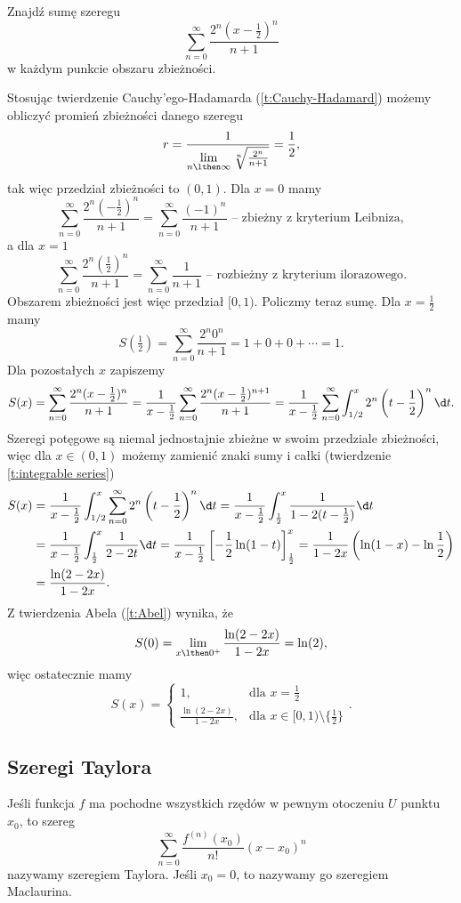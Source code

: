 \begin{example}
    Znajdź sumę szeregu
    \[ \sum_{n=0}^\infty \frac{2^n(x - \frac{1}{2})^n}{n+1} \]
    w każdym punkcie obszaru zbieżności.
\end{example}
\begin{solution}
    Stosując twierdzenie Cauchy'ego-Hadamarda (\ref{t:Cauchy-Hadamard}) możemy obliczyć promień zbieżności danego szeregu
    \[ r = \frac{1}{\lim\limits_{n\lthen\infty}\sqrt[n]{\frac{2^n}{n+1}}} = \frac{1}{2}, \]
    tak więc przedział zbieżności to $(0, 1)$.
    Dla $x = 0$ mamy
    \[ \sum_{n=0}^\infty \frac{2^n\left(-\frac{1}{2}\right)^n}{n+1} = \sum_{n=0}^\infty \frac{(-1)^n}{n+1} \text{ -- zbieżny z kryterium Leibniza}, \]
    a dla $x = 1$
    \[ \sum_{n=0}^\infty \frac{2^n\left(\frac{1}{2}\right)^n}{n+1} = \sum_{n=0}^\infty \frac{1}{n+1} \text{ -- rozbieżny z kryterium ilorazowego}. \]
    Obszarem zbieżności jest więc przedział $[0, 1)$. Policzmy teraz sumę. Dla $x = \frac{1}{2}$ mamy
    \[ S(\tfrac{1}{2}) = \sum_{n=0}^\infty \frac{2^n0^n}{n+1} = 1 + 0 + 0 + \cdots = 1. \]
    Dla pozostałych $x$ zapiszemy
    \[ S(x) = \sum_{n=0}^\infty \frac{2^n(x - \frac{1}{2})^n}{n+1} = \frac{1}{x - \frac{1}{2}}\sum_{n=0}^\infty \frac{2^n(x - \frac{1}{2})^{n+1}}{n+1} = \frac{1}{x - \frac{1}{2}}\sum_{n=0}^\infty \int_{1/2}^x 2^n\left(t-\frac{1}{2}\right)^n\d t. \]
    Szeregi potęgowe są niemal jednostajnie zbieżne w swoim przedziale zbieżności, więc dla $x \in (0, 1)$ możemy zamienić znaki sumy i całki (twierdzenie \ref{t:integrable series})
    \begin{align*}
        S(x) &= \frac{1}{x - \frac{1}{2}}\int_{1/2}^x \sum_{n=0}^\infty 2^n\left(t-\frac{1}{2}\right)^n\d t = \frac{1}{x - \frac{1}{2}}\int_{\frac{1}{2}}^x \frac{1}{1 - 2(t - \frac{1}{2})}\d t \\
        &= \frac{1}{x - \frac{1}{2}}\int_{\frac{1}{2}}^x \frac{1}{2 - 2t}\d t = \frac{1}{x - \frac{1}{2}}\left[-\frac{1}{2}\ln(1 - t)\right]_{\frac{1}{2}}^x = \frac{1}{1 - 2x}\left(\ln(1 - x) - \ln{\frac{1}{2}}\right) \\
        &= \frac{\ln(2 - 2x)}{1 - 2x}.
    \end{align*}
    Z twierdzenia Abela (\ref{t:Abel}) wynika, że
    \[ S(0) = \lim_{x\lthen 0^+}\frac{\ln(2 - 2x)}{1 - 2x} = \ln(2), \]
    więc ostatecznie mamy
    \[ S(x) = \begin{cases}1, & \text{dla } x = \tfrac{1}{2} \\ \frac{\ln(2 - 2x)}{1 - 2x}, & \text{dla } x \in [0, 1)\setminus \{\tfrac{1}{2}\} \end{cases}. \]
\end{solution}

\subsection{Szeregi Taylora}
\begin{definition}
    Jeśli funkcja $f$ ma pochodne wszystkich rzędów w pewnym otoczeniu $U$ punktu $x_0$, to szereg
    \[ \sum_{n=0}^\infty \frac{f^{(n)}(x_0)}{n!}(x - x_0)^n \]
    nazywamy szeregiem Taylora. Jeśli $x_0 = 0$, to nazywamy go szeregiem Maclaurina.
\end{definition}
